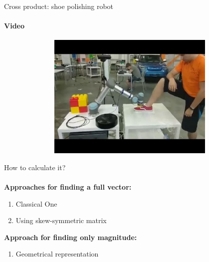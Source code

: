 \documentclass[aspectratio=169,notes]{beamer}
\begin{document}
\begin{frame}[t]{Cross product: shoe polishing robot}
    \framesubtitle{Video}
    \vspace{-0.6cm}
    \begin{figure}[H]
        \href{https://docs.google.com/file/d/1VUmfmPc0qDTr51urLhXwV8uEXJ1DJfGC/preview}{
            \centering\includegraphics[height=6cm,width=1\textwidth,keepaspectratio]{resources/image12.jpg}}
        \label{fig:resources/image12.jpg}
    \end{figure}
\end{frame}

\begin{frame}[t]{How to calculate it?}
\framesubtitle{}
    \textbf{\LARGE Approaches for finding a full vector:}
    \begin{enumerate}
        \item Classical One
        \item Using skew-symmetric matrix
    \end{enumerate}
    \bigskip
    
    \textbf{\LARGE Approach for finding only magnitude:}
    \begin{enumerate}
        \item Geometrical representation
    \end{enumerate}
\end{frame}
\end{document}
